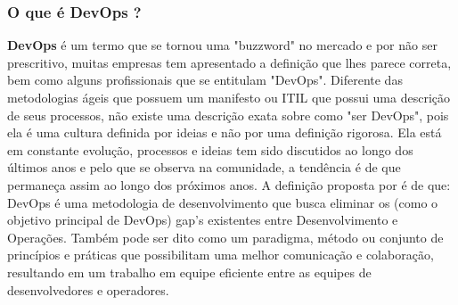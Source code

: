 \documentclass[twoside,english,brazilian]{UNISINOSartigo}
\begin{document}
\subsubsection{O que é DevOps ?}

\textbf{DevOps} é um termo que se tornou uma "buzzword" no mercado e  por não ser prescritivo, muitas empresas tem apresentado a definição que lhes parece correta, bem como alguns profissionais que se entitulam "DevOps". 
Diferente das metodologias ágeis que possuem um manifesto ou ITIL que possui uma descrição de seus processos, não existe uma descrição exata sobre como "ser DevOps", pois ela é uma cultura definida por ideias e não por uma definição rigorosa. Ela está em constante evolução, processos e ideias tem sido discutidos ao longo dos últimos anos e pelo que se observa na comunidade, a tendência é de que permaneça assim ao longo dos próximos anos.  \cite{Fallis2013}  \newline
A definição proposta por \citep{Jabbari2016} é de que: DevOps é uma metodologia de desenvolvimento que busca eliminar os (como o objetivo principal de DevOps) gap's existentes entre Desenvolvimento e Operações. Também pode ser dito como um paradigma, método ou conjunto de princípios e práticas que possibilitam uma melhor comunicação e colaboração, resultando em um trabalho em equipe eficiente entre as equipes de desenvolvedores e operadores.
\end{document}

